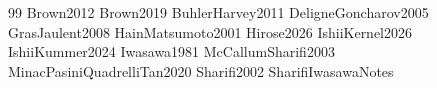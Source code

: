 \documentclass[11pt]{article}
\begin{document}

\begin{thebibliography}{99}
Brown2012
Brown2019
BuhlerHarvey2011
DeligneGoncharov2005
GrasJaulent2008
HainMatsumoto2001
Hirose2026
IshiiKernel2026
IshiiKummer2024
Iwasawa1981
McCallumSharifi2003
MinacPasiniQuadrelliTan2020
Sharifi2002
SharifiIwasawaNotes
\end{thebibliography}
\end{document}
